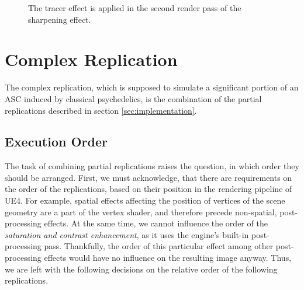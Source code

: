 \begin{figure}[H]
    \centering
    \ifgraphics
    \fi
    \caption{The tracer effect is applied in the second render pass of the sharpening effect.}\label{fig:tracers-order}
\end{figure}

\section{Complex Replication}
The complex replication, which is supposed to simulate a significant portion of an \ac{ASC} induced by classical psychedelics, is the combination of the partial replications described in section \ref{sec:implementation}.

\subsection{Execution Order}
The task of combining partial replications raises the question, in which order they should be arranged. First, we must acknowledge, that there are requirements on the order of the replications, based on their position in the rendering pipeline of \ac{UE4}. For example, spatial effects affecting the position of vertices of the scene geometry are a part of the vertex shader, and therefore precede non-spatial, post-processing effects. At the same time, we cannot influence the order of the \textit{saturation and contrast enhancement}, as it uses the engine's built-in post-processing pass. Thankfully, the order of this particular effect among other post-processing effects would have no influence on the resulting image anyway. Thus, we are left with the following decisions on the relative order of the following replications.


